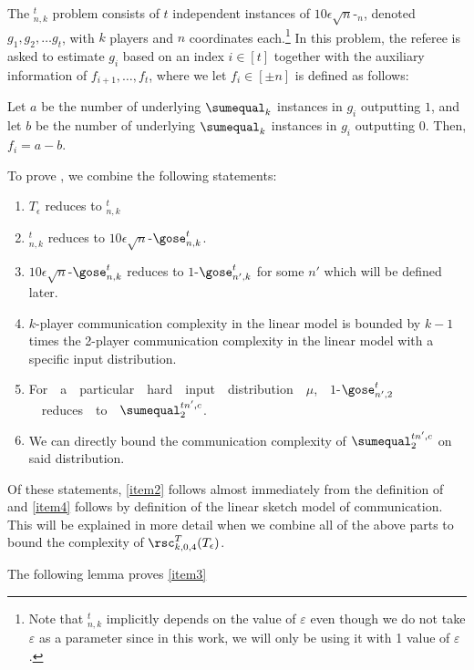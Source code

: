 \begin{definition}
The \auggo$_{n,k}^t$ problem consists of $t$ independent instances of $10\epsilon\sqrt{n}$-\gose$_n$, denoted $g_1, g_2, \dots g_t$, with $k$ players and $n$ coordinates each.\footnote{Note that \auggo$_{n,k}^t$ implicitly depends on the value of $\varepsilon$ even though we do not take $\varepsilon$ as a parameter since in this work, we will only be using it with 1 value of $\varepsilon$.} In this problem, the referee is asked to estimate $g_i$ based on an index $i\in[t]$ together with the auxiliary information of $f_{i+1},\dots, f_t$, where we let $f_i \in [\pm n]$ is defined as follows:

{\color{black}Let $a$ be the number of underlying $\sumequal_k$ instances in $g_i$ outputting $1$, and let $b$ be the number of underlying $\sumequal_k$ instances in $g_i$ outputting $0$. Then, $f_i = a-b$.}
\end{definition}
{\color{black}
To prove , we combine the following statements:
%

%
%
\begin{enumerate}[(1)]
    \item \label{item1} $T_\epsilon$ reduces to \auggo$_{n,k}^t$
    \item \label{item2}
      \auggo$_{n,k}^t$ reduces to $10\epsilon \sqrt{n}$-$\gose_{n,k}^t$.
    \item \label{item3}
$10\epsilon \sqrt{n}$-$\gose_{n,k}^t$ reduces to $1$-$\gose_{n',k}^t$ for some $n'$ which will be defined later.
    \item \label{item4}
$k$-player communication complexity in the linear model is bounded by $k-1$ times the 2-player communication complexity in the linear model with a specific input distribution.
%
%
    \item \label{item5}
For\ \  a\ \ particular\ \ hard\ \ input\ \ distribution\ \ $\mu$,\ \
 $1$-$\gose_{n',2}^t$\ \ reduces\ \ to\ \ $\sumequal_2^{tn',c}$.
    \item \label{item6}
We can directly bound the communication complexity of $\sumequal_2^{tn',c}$ on said distribution.
\end{enumerate}
Of these statements, %
\ref{item2}   %
follows almost immediately from the definition of \auggo \hspace{0em} and 
%
\ref{item4}   %
follows by definition of the linear sketch model of communication. This will be explained in more detail when we combine all of the above parts to bound the complexity of $\rsc_{k,0,4}^T(T_\epsilon)$.

The following lemma proves %
\ref{item3}   %
}

